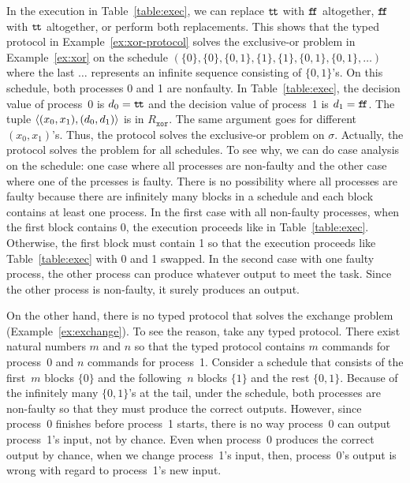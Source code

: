  \begin{example}
  \label{ex:solv}
  In the execution in Table~\ref{table:exec}, we can replace $\texttt{t\kern -1.2pt t}$
  with $\texttt{f\kern -1.7pt f}$ altogether, $\texttt{f\kern -1.7pt f}$ with $\texttt{t\kern -1.2pt t}$ altogether, or perform
  both replacements.
  This shows that the typed protocol in Example~\ref{ex:xor-protocol}
  solves the exclusive-or problem in Example~\ref{ex:xor} on the
  schedule
  $(\{0\}, \{0\}, \{0,1\}, \{1\}, \{1\}, \{0,1\}, \{0,1\},\ldots)$ where
  the last $\ldots$ represents an infinite sequence consisting of
  $\{0,1\}$'s.
  On this schedule, both processes 0 and 1 are nonfaulty.
  In Table~\ref{table:exec}, the decision value of process~0 is $d_0 =
  \texttt{t\kern -1.2pt t}$ and the decision value of process~1 is $d_1=\texttt{f\kern -1.7pt f}$.
  The tuple $\langle{(x_0,x_1),(d_0,d_1)}\rangle$ is in $R_{\mathtt{xor}}$.
  The same argument goes for different $(x_0,x_1)$'s.
  Thus, the protocol solves the exclusive-or problem on $\sigma$.
  Actually, the protocol solves the problem for all schedules.
  To see why, we can do case analysis on the schedule:
  one case where all processes are non-faulty and the other case where
  one of the prcesses is faulty.  There is no possibility where all
  processes are faulty because there are infinitely many blocks in a
  schedule and each block contains at least one process.
  In the first case with all non-faulty processes, when the first block
  contains 0, the execution proceeds like in Table~\ref{table:exec}.
  Otherwise, the first block must contain 1 so that the execution
  proceeds like Table~\ref{table:exec} with 0 and 1 swapped.
  In the second case with one faulty process, the other process can
  produce whatever output to meet the task.  Since the other process is
  non-faulty, it surely produces an output.
 \end{example}
  \begin{example}
   On the other hand, there is no typed protocol that solves
   the exchange problem (Example~\ref{ex:exchange}).
   To see the reason, take any typed protocol.
   There exist natural numbers $m$ and $n$ so that
   the typed protocol contains $m$ commands
   for process~0 and $n$ commands for process~1.
   Consider a schedule that consists of the first~$m$ blocks $\{0\}$ and
   the following~$n$ blocks $\{1\}$ and the rest $\{0,1\}$.
   Because of the infinitely many $\{0,1\}$'s at the tail,
   under the schedule, both processes are non-faulty so that they must
   produce the correct outputs.
   However, since process~0 finishes before process~1 starts, there is
   no way process~0 can output process~1's input, not by chance.
   Even when process~0 produces the correct output by chance, when we
   change process~1's input, then, process~0's output is wrong with
   regard to process~1's new input.
  \end{example}


